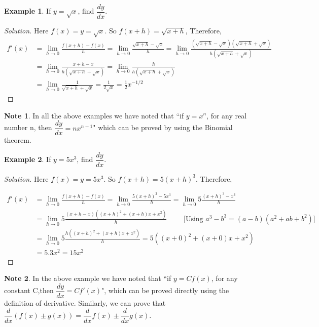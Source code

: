 \documentclass[../../main.tex]{subfiles}
\theoremstyle{definition}
\newtheorem{example}{Example}[section]
\newtheorem*{note}{Note}
\newenvironment{solution}
    {\begin{proof}[Solution]}
    {\end{proof}}
\begin{document}
\begin{example}
If $y= \sqrt{x}$, find $\dfrac{dy}{dx}.$    
\end{example}

\begin{solution}
Here $f(x)=y=\sqrt{x}.$ So $f(x+h)=\sqrt{x+h}$, Therefore, 
\begin{align*}
f'(x) &= \lim_{h \rightarrow 0} \frac {f(x+h)-f(x)}{h} = \lim_{h \rightarrow 0} \frac {\sqrt{x+h}-\sqrt{x}}{h} = \lim_{h \rightarrow 0} \frac {(\sqrt{x+h}-\sqrt{x})(\sqrt{x+h}+\sqrt{x})}{h(\sqrt{x+h}+\sqrt{x})} \\
&=\lim_{h \rightarrow 0} \frac {x+h-x}{h(\sqrt{x+h}+\sqrt{x})} = \lim_{h \rightarrow 0} \frac {h}{h(\sqrt{x+h}+\sqrt{x})} \\
&=\lim_{h \rightarrow 0} \frac {1}{\sqrt{x+h}+\sqrt{x}} = \frac{1}{2\sqrt{x}} = \frac{1}{2}x^{-1/2}
\end{align*}
\end{solution}


\begin{note}
In all the above examples we have noted that ``if $y=x^n$, for any real number n, then $\dfrac{dy}{dx}=nx^{n-1}$" which can be proved by using the Binomial theorem.
\end{note}

\begin{example}
If $y= 5x^3$, find $\dfrac{dy}{dx}.$    
\end{example}

\begin{solution}
 Here $f(x)=y=5x^3.$ So $f(x+h)= 5(x+h)^3$. Therefore, 

\begin{align*}
f'(x) &= \lim_{h \rightarrow 0} \frac {f(x+h)-f(x)}{h} = \lim_{h \rightarrow 0} \frac {5(x+h)^3-5x^3}{h} = \lim_{h \rightarrow 0} 5\frac {(x+h)^3-x^3}{h} \\
&= \lim_{h \rightarrow 0} 5\frac {(x+h-x)((x+h)^2+(x+h)x+x^2)}{h} \qquad \text{ [Using } a^3-b^3=(a-b)(a^2+ab+b^2) \text{]} \\
&= \lim_{h \rightarrow 0} 5\frac{h((x+h)^2+(x+h)x+x^2)}{h} = 5((x+0)^2+(x+0)x+x^2) \\
&= 5.3x^2 = 15x^2
 \end{align*}
\end{solution}

\begin{note}
In the above example we have noted that ``if $y=Cf(x)$, for any constant C,then $\dfrac{dy}{dx}=Cf'(x)$", which can be proved directly using the definition of derivative. Similarly,  we can prove that $\dfrac{d}{dx}(f(x)\pm g(x))=\dfrac{d}{dx}f(x)\pm \dfrac{d}{dx}g(x).$
\end{note}
\end{document}
